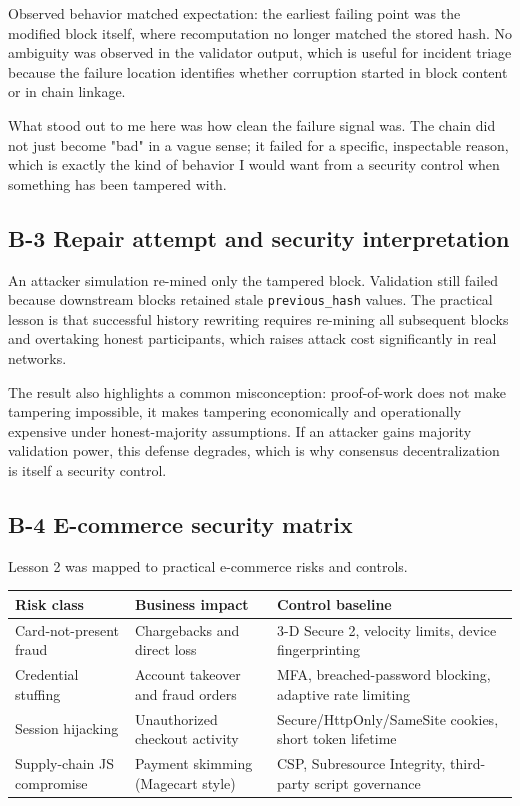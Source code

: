 \documentclass[10pt,a4paper]{article}
\begin{document}
Observed behavior matched expectation: the earliest failing point was the modified block itself, where recomputation no longer matched the stored hash. No ambiguity was observed in the validator output, which is useful for incident triage because the failure location identifies whether corruption started in block content or in chain linkage.

What stood out to me here was how clean the failure signal was. The chain did not just become "bad" in a vague sense; it failed for a specific, inspectable reason, which is exactly the kind of behavior I would want from a security control when something has been tampered with.

\subsection*{B-3 Repair attempt and security interpretation}
An attacker simulation re-mined only the tampered block. Validation still failed because downstream blocks retained stale \texttt{previous\_hash} values. The practical lesson is that successful history rewriting requires re-mining all subsequent blocks and overtaking honest participants, which raises attack cost significantly in real networks.

The result also highlights a common misconception: proof-of-work does not make tampering impossible, it makes tampering economically and operationally expensive under honest-majority assumptions. If an attacker gains majority validation power, this defense degrades, which is why consensus decentralization is itself a security control.

\subsection*{B-4 E-commerce security matrix}
Lesson 2 was mapped to practical e-commerce risks and controls.

\begin{longtable}{p{3.4cm}p{4.2cm}p{6.8cm}}
\toprule
Risk class & Business impact & Control baseline \\
\midrule
Card-not-present fraud & Chargebacks and direct loss & 3-D Secure 2, velocity limits, device fingerprinting \\
Credential stuffing & Account takeover and fraud orders & MFA, breached-password blocking, adaptive rate limiting \\
Session hijacking & Unauthorized checkout activity & Secure/HttpOnly/SameSite cookies, short token lifetime \\
Supply-chain JS compromise & Payment skimming (Magecart style) & CSP, Subresource Integrity, third-party script governance \\
\bottomrule
\end{longtable}
\end{document}
